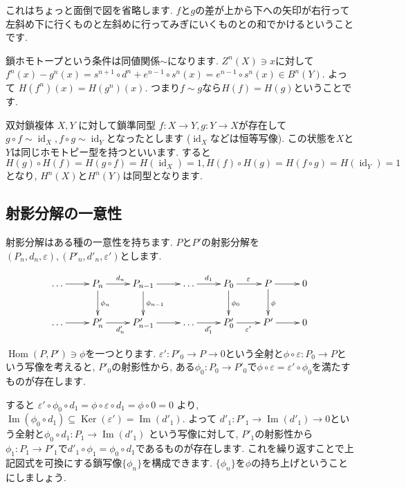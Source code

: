 \documentclass{jsarticle}
\newcommand{\makeop}[1]{\mathop{\mathrm{#1}}\nolimits}
\def\Im{\makeop{Im}}
\def\Ker{\makeop{Ker}}
\def\Hom{\makeop{Hom}}
\def\id{\makeop{id}}
\theoremstyle{definition}
\numberwithin{theorem}{section}
\begin{document}
これはちょっと面倒で図を省略します. $f$と$g$の差が上から下への矢印が右行って左斜め下に行くものと左斜めに行ってみぎにいくものとの和でかけるということです.

鎖ホモトープという条件は同値関係$\sim$になります. $Z^n(X) \ni x$に対して$f^n(x) - g^n(x) = s^{n+1} \circ d^n + e^{n-1}\circ s^n(x) = e^{n-1}\circ s^n(x) \in B^n(Y)$. 
よって $H(f^n)(x) = H(g^n)(x)$. つまり$f\sim g$なら$H(f) = H(g)$ということです.

双対鎖複体 $X, Y$ に対して鎖準同型 $f: X\rightarrow Y, g: Y\rightarrow X$が存在して $g\circ f \sim \id_X, f\circ g \sim \id_Y$となったとします
($\id_X$などは恒等写像). この状態を$X$と$Y$は同じホモトピー型を持つといいます. すると $H(g)\circ H(f) = H(g\circ f) = H(\id_X) = 1, H(f)\circ H(g) = H(f\circ g) = H(\id_Y) = 1$となり, 
$H^n(X)$と$H^n(Y)$は同型となります. 

\subsection{射影分解の一意性}
射影分解はある種の一意性を持ちます. $P$と$P'$の射影分解を$(P_n, d_n, \varepsilon), (P'_n, d'_n, \varepsilon')$とします.

\begin{equation*}
\xymatrix{
  \ldots \ar[r] & P_n \ar[r]^{d_n} \ar[d]^{\phi_n} & P_{n-1} \ar[r] \ar[d]^{\phi_{n-1}} & \ldots \ar[r]^{d_1} & P_0 \ar[r]^{\varepsilon} \ar[d]^{\phi_0} & P \ar[r] \ar[d]^{\phi} & 0 \\
  \ldots \ar[r] & P'_n \ar[r]_{d'_n} & P'_{n-1} \ar[r]& \ldots \ar[r]_{d'_1}& P'_0 \ar[r]_{\varepsilon'} & P' \ar[r]& 0
}
\end{equation*}

$\Hom(P, P') \ni \phi$を一つとります. $\varepsilon': P'_0 \rightarrow P \rightarrow 0$という全射と$\phi\circ\varepsilon: P_0 \rightarrow P$という写像を考えると, 
$P'_0$の射影性から, ある$\phi_0: P_0 \rightarrow P'_0$で$\phi\circ\varepsilon = \varepsilon'\circ\phi_0$を満たすものが存在します. 

すると $\varepsilon'\circ\phi_0\circ d_1 = \phi\circ\varepsilon\circ d_1 = \phi\circ 0 = 0$ より, $\Im(\phi_0\circ d_1) \subseteq \Ker(\varepsilon') = \Im(d'_1)$.
よって $d'_1 : P'_1 \rightarrow \Im(d'_1) \rightarrow 0$という全射と$\phi_0\circ d_1: P_1 \rightarrow \Im(d'_1)$
という写像に対して, $P'_1$の射影性から$\phi_1: P_1 \rightarrow P'_1$で$d'_1\circ \phi_1 = \phi_0\circ d_1$であるものが存在します.
これを繰り返すことで上記図式を可換にする鎖写像$\{\phi_n\}$を構成できます. $\{\phi_n\}$を$\phi$の持ち上げということにしましょう.
\vspace{2cm}
\end{document}
